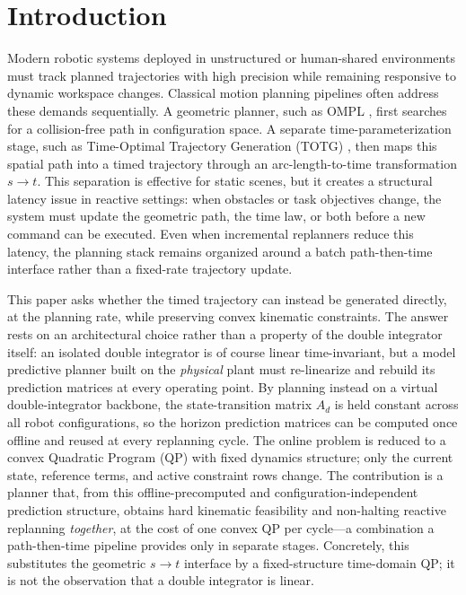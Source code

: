 \section{Introduction}\label{i.-introduction}

Modern robotic systems deployed in unstructured or human-shared
environments must track planned trajectories with high precision while
remaining responsive to dynamic workspace changes. Classical motion
planning pipelines often address these demands sequentially. A geometric
planner, such as OMPL \cite{ompl}, first searches for a collision-free
path in configuration space. A separate time-parameterization stage, such
as Time-Optimal Trajectory Generation (TOTG) \cite{pham2015},
then maps this spatial path into a timed trajectory through an
arc-length-to-time transformation \(s\rightarrow t\). This separation is
effective for static scenes, but it creates a structural latency issue in
reactive settings: when obstacles or task objectives change, the system
must update the geometric path, the time law, or both before a new
command can be executed. Even when incremental replanners reduce this
latency, the planning stack remains organized around a batch
path-then-time interface rather than a fixed-rate trajectory update.

This paper asks whether the timed trajectory can instead be generated
directly, at the planning rate, while preserving convex kinematic
constraints. The answer rests on an architectural choice rather than a
property of the double integrator itself: an isolated double integrator
is of course linear time-invariant, but a model predictive planner built
on the \emph{physical} plant must re-linearize and rebuild its prediction
matrices at every operating point. By planning instead on a virtual
double-integrator backbone, the state-transition matrix \(A_d\) is held
constant across all robot configurations, so the horizon prediction
matrices can be computed once offline and reused at every replanning
cycle. The online problem is reduced to a convex Quadratic Program (QP)
with fixed dynamics structure; only the current state, reference terms,
and active constraint rows change. The contribution is a planner that,
from this offline-precomputed and configuration-independent prediction
structure, obtains hard kinematic feasibility and non-halting reactive
replanning \emph{together}, at the cost of one convex QP per cycle---a
combination a path-then-time pipeline provides only in separate stages.
Concretely, this substitutes the
geometric \(s\rightarrow t\) interface by a fixed-structure time-domain
QP; it is not the observation that a double integrator is linear.

